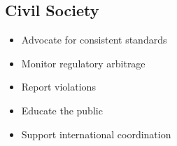 \subsection{Civil Society}

\begin{itemize}
    \item Advocate for consistent standards
    \item Monitor regulatory arbitrage
    \item Report violations
    \item Educate the public
    \item Support international coordination
\end{itemize}

\cleardoublepage
